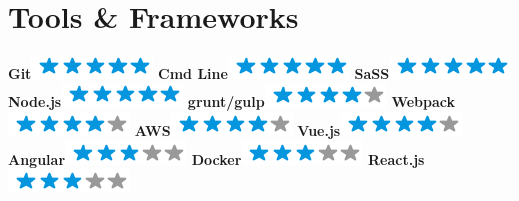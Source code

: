 \documentclass[]{friggeri-cv}
\begin{document}
\newpage

\begin{aside}
~
~
~
  \section{Tools \& Frameworks}
    \textbf{Git}\includegraphics[scale=0.40]{img/5stars.png}
    \textbf{Cmd Line}\includegraphics[scale=0.40]{img/5stars.png}
    \textbf{SaSS}\includegraphics[scale=0.40]{img/5stars.png}
    \textbf{Node.js}\includegraphics[scale=0.40]{img/5stars.png}
     \textbf{grunt/gulp}\includegraphics[scale=0.40]{img/4stars.png}
     \textbf{Webpack}\includegraphics[scale=0.40]{img/4stars.png}
     \textbf{AWS}\includegraphics[scale=0.40]{img/4stars.png}
     \textbf{Vue.js}\includegraphics[scale=0.40]{img/4stars.png}
     \textbf{Angular}\includegraphics[scale=0.40]{img/3stars.png}
      \textbf{Docker}\includegraphics[scale=0.40]{img/3stars.png}
     \textbf{React.js}\includegraphics[scale=0.40]{img/3stars.png}



\end{aside}
\end{document}
